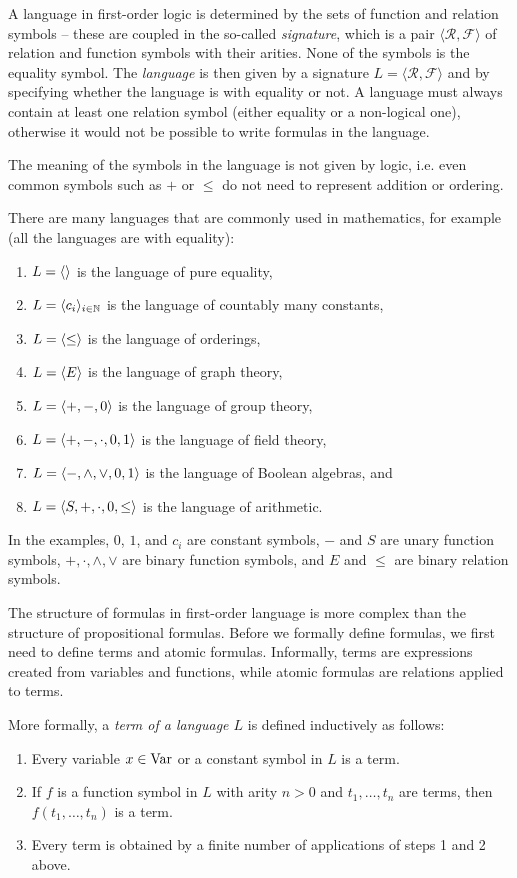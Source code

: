 A language in first-order logic is determined by the sets of function and relation symbols -- these are coupled in the so-called \emph{signature}, which is a pair $\langle \mathcal{R}, \mathcal{F} \rangle$ of relation and function symbols with their arities. None of the symbols is the equality symbol. The \emph{language} is then given by a signature $L = \langle \mathcal{R}, \mathcal{F} \rangle$ and by specifying whether the language is with equality or not. A language must always contain at least one relation symbol (either equality or a non-logical one), otherwise it would not be possible to write formulas in the language.

The meaning of the symbols in the language is not given by logic, i.e. even  common symbols such as $+$ or $\leq$ do not need to represent addition or ordering.

There are many languages that are commonly used in mathematics, for example (all the languages are with equality):
\begin{enumerate}
  \item $L = \langle   \rangle$ is the language of pure equality,
  \item $L = \langle c_i \rangle_{i \in \mathbb{N}}$ is the language of countably many constants,
  \item $L = \langle \leq \rangle$ is the language of orderings,
  \item $L = \langle E  \rangle$ is the language of graph theory,
  \item $L = \langle +, -, 0 \rangle$ is the language of group theory,
  \item $L = \langle +, -, \cdot, 0, 1 \rangle$ is the language of field theory,
  \item $L = \langle -, \land, \lor, 0, 1 \rangle$ is the language of Boolean algebras, and
  \item $L = \langle S, +, \cdot, 0, \leq \rangle$ is the language of arithmetic.
\end{enumerate}
In the examples, $0$, $1$, and $c_i$ are constant symbols, $-$ and $S$ are unary function symbols, $+, \cdot, \land, \lor$ are binary function symbols, and $E$ and $\leq$ are binary relation symbols.

The structure of formulas in first-order language is more complex than the structure of propositional formulas. Before we formally define formulas, we first need to define terms and atomic formulas. Informally, terms are expressions created from variables and functions, while atomic formulas are relations applied to terms.

More formally, a \emph{term of a language $L$} is defined inductively as follows:
\begin{enumerate}
  \item Every variable $x \in \operatorname{Var}$ or a constant symbol in $L$ is a term.
  \item If $f$ is a function symbol in $L$ with arity $n>0$ and $t_1, \dots, t_n$ are terms, then $f(t_1, \dots, t_n)$ is a term.
  \item Every term is obtained by a finite number of applications of steps 1 and 2 above.
\end{enumerate}


